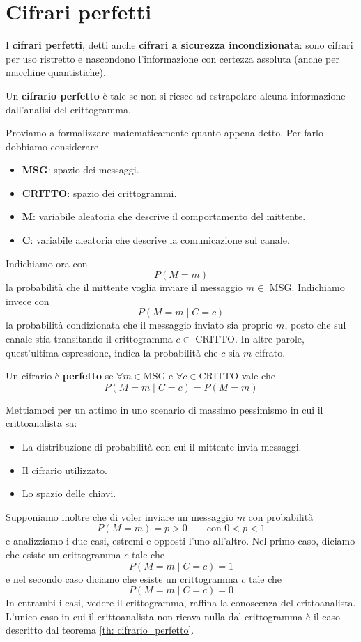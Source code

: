 \chapter{Cifrari perfetti}\label{perfetti}
I \textbf{cifrari perfetti}, detti anche \textbf{cifrari a sicurezza incondizionata}: sono cifrari per uso ristretto e
nascondono l'informazione con certezza assoluta (anche per macchine quantistiche).

Un \textbf{cifrario perfetto} \`e tale se non si riesce ad estrapolare alcuna informazione dall'analisi del crittogramma.

Proviamo a formalizzare matematicamente quanto appena detto. Per farlo dobbiamo considerare
\begin{itemize}
	\item \textbf{MSG}: spazio dei messaggi.
	\item \textbf{CRITTO}: spazio dei crittogrammi.
	\item \textbf{M}: variabile aleatoria che descrive il comportamento del	mittente.
	\item \textbf{C}: variabile aleatoria che descrive la comunicazione sul canale.
\end{itemize}
Indichiamo ora con
\[ P(M = m) \]
la probabilit\`a che il mittente voglia inviare il messaggio $m \in$ MSG. Indichiamo invece con
\[ P(M = m \mid C = c) \]
la probabilit\`a condizionata che il messaggio inviato sia proprio $m$, posto che sul canale stia transitando il
crittogramma $c \in$ CRITTO. In altre parole, quest'ultima espressione, indica la probabilit\`a che $c$ sia $m$ cifrato.

\begin{theorem}\label{th: cifrario_perfetto}
	Un cifrario \`e \textbf{perfetto} se $\forall m \in \text{MSG}$ e $\forall c \in \text{CRITTO}$ vale che
	\[ P(M = m \mid C = c) = P(M = m) \]
\end{theorem}

Mettiamoci per un attimo in uno scenario di massimo pessimismo in cui il crittoanalista sa:
\begin{itemize}
	\item La distribuzione di probabilit\`a con cui il mittente invia messaggi.
	\item Il cifrario utilizzato.
	\item Lo spazio delle chiavi.
\end{itemize}
Supponiamo inoltre che di voler inviare un messaggio $m$ con probabilit\`a
\[ P(M = m) = p > 0 \quad \quad \text{con } 0 < p < 1 \]
e analizziamo i due casi, estremi e opposti l'uno all'altro. Nel primo caso, diciamo che esiste un crittogramma $c$
tale che
\[ P(M = m \mid C = c) = 1 \]
e nel secondo caso diciamo che esiste un crittogramma $c$ tale che
\[ P(M = m \mid C = c) = 0 \]
In entrambi i casi, vedere il crittogramma, raffina la conoscenza del crittoanalista. L'unico caso in cui il
crittoanalista non ricava nulla dal crittogramma \`e il caso descritto dal teorema \ref{th: cifrario_perfetto}.


